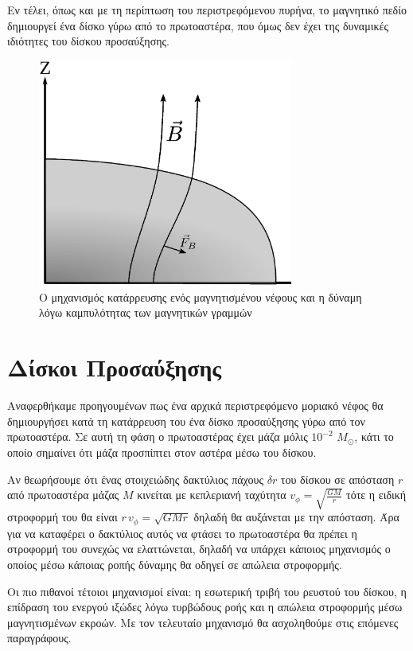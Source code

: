 \documentclass[a4paper,12pt]{memoir}
\newcommand{\sm}{$M_{\odot}$}
\begin{document}
Εν τέλει, όπως και με τη περίπτωση του περιστρεφόμενου πυρήνα, το μαγνητικό πεδίο δημιουργεί ένα δίσκο γύρω από το πρωτοαστέρα, που όμως δεν έχει της δυναμικές ιδιότητες του δίσκου προσαύξησης.


\begin{figure}[h!]
	\centering
	\includegraphics[height=7.5cm]{images/magnetic_collapse.ps}
	\caption{Ο μηχανισμός κατάρρευσης ενός μαγνητισμένου νέφους και η δύναμη λόγω καμπυλότητας των μαγνητικών γραμμών}
\end{figure}


\section{Δίσκοι Προσαύξησης}
Αναφερθήκαμε προηγουμένων πως ένα αρχικά περιστρεφόμενο μοριακό νέφος θα δημιουργήσει κατά τη κατάρρευση του ένα δίσκο προσαύξησης γύρω από τον πρωτοαστέρα. Σε αυτή τη φάση ο πρωτοαστέρας έχει μάζα μόλις $10^{-2}$ \sm, κάτι το οποίο σημαίνει ότι μάζα προσπίπτει στον αστέρα μέσω του δίσκου.

Αν θεωρήσουμε ότι ένας στοιχειώδης δακτύλιος πάχους $\delta r$ του δίσκου σε απόσταση $r$ από πρωτοαστέρα μάζας $M$ κινείται με κεπλεριανή ταχύτητα $v_{\phi}=\sqrt{\frac{GM}{r}}$ τότε η ειδική στροφορμή του θα είναι $r \, v_{\phi}=\sqrt{GMr}$ δηλαδή θα αυξάνεται με την απόσταση. Άρα για να καταφέρει ο δακτύλιος αυτός να φτάσει το πρωτοαστέρα θα πρέπει η στροφορμή του συνεχώς να ελαττώνεται, δηλαδή να υπάρχει κάποιος μηχανισμός ο οποίος μέσω κάποιας ροπής δύναμης θα οδηγεί σε απώλεια στροφορμής.

Οι πιο πιθανοί τέτοιοι μηχανισμοί είναι: η εσωτερική τριβή του ρευστού του δίσκου, η επίδραση του ενεργού ιξώδες λόγω τυρβώδους ροής και η απώλεια στροφορμής μέσω μαγνητισμένων εκροών.
Με τον τελευταίο μηχανισμό θα ασχοληθούμε στις επόμενες παραγράφους.
\end{document}
